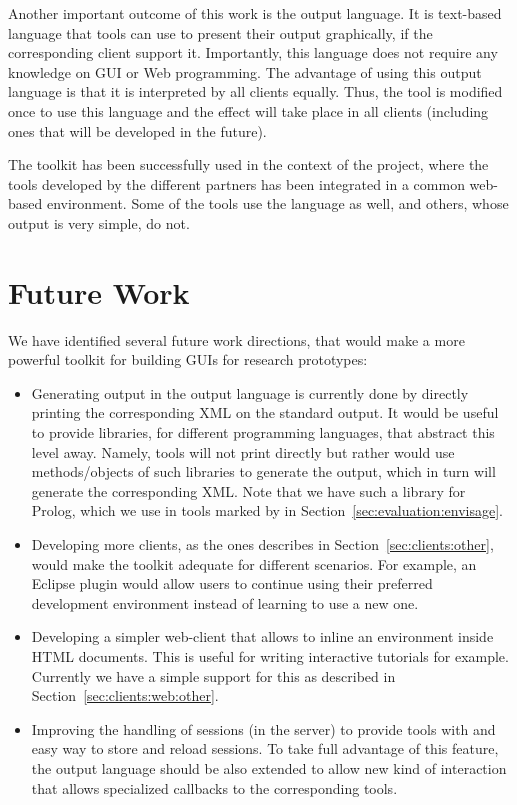 Another important outcome of this work is the \ei output
language. It is text-based language that tools can use to present
their output graphically, if the corresponding client support it.
%
Importantly, this language does not require any knowledge on GUI or
Web programming. The advantage of using this output language is that
it is interpreted by all \ei clients equally. Thus, the tool is
modified once to use this language and the effect will take place in
all clients (including ones that will be developed in the future).

The \ei toolkit has been successfully used in the context of the
\envisage project, where the tools developed by the different partners
has been integrated in a common web-based environment. Some of the
tools use the \ei language as well, and others, whose output is very
simple, do not.

\section{Future Work}

We have identified several future work directions, that would make \ei
a more powerful toolkit for building GUIs for research prototypes:

\begin{itemize}

\item Generating output in the \ei output language is currently done
  by directly printing the corresponding XML on the standard output.
  It would be useful to provide libraries, for different programming
  languages, that abstract this level away. Namely, tools will not
  print directly but rather would use methods/objects of such
  libraries to generate the output, which in turn will generate the
  corresponding XML.
  Note that we have such a library for Prolog, which we use in tools
  marked by  in Section~\ref{sec:evaluation:envisage}.

\item Developing more \ei clients, as the ones describes in
  Section~\ref{sec:clients:other}, would make the toolkit adequate for
  different scenarios. For example, an Eclipse plugin would allow
  users to continue using their preferred development environment
  instead of learning to use a new one.

\item Developing a simpler web-client that allows to inline an \ei
  environment inside HTML documents. This is useful for writing
  interactive tutorials for example. Currently we have a simple
  support for this as described in
  Section~\ref{sec:clients:web:other}.

\item Improving the handling of sessions (in the \ei server) to
  provide tools with and easy way to store and reload sessions. To
  take full advantage of this feature, the \ei output language should
  be also extended to allow new kind of interaction that allows
  specialized callbacks to the corresponding tools.

\end{itemize}


